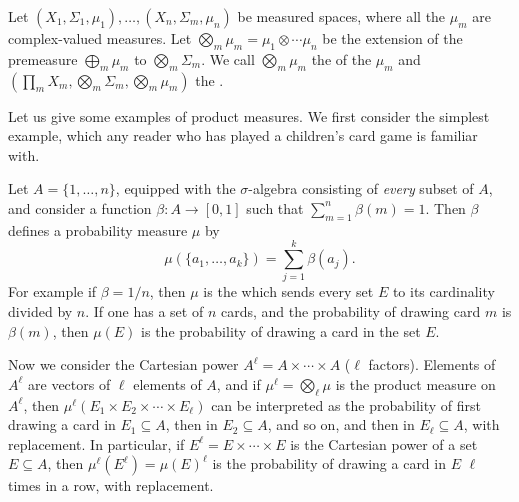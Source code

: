 \begin{definition}
Let $(X_{1}, \Sigma_{1}, \mu_{1}), \dots, (X_{n}, \Sigma_{m}, \mu_{n})$ be measured spaces, where all the $\mu_{m}$ are complex-valued measures.
Let $\bigotimes_{m} \mu_{m} = \mu_{1} \otimes \cdots \mu_{n}$ be the extension of the premeasure $\bigoplus_{m} \mu_{m}$ to $\bigotimes_{m} \Sigma_{m}$.
We call $\bigotimes_{m} \mu_{m}$ the  of the $\mu_{m}$ and $(\prod_{m} X_{m}, \bigotimes_{m} \Sigma_{m}, \bigotimes_{m} \mu_{m})$ the .
\end{definition}

Let us give some examples of product measures.
We first consider the simplest example, which any reader who has played a children's card game is familiar with.

\begin{example}\label{card games}
Let $A = \{1, \dots, n\}$, equipped with the $\sigma$-algebra consisting of \emph{every} subset of $A$, and consider a function $\beta: A \to [0, 1]$ such that $\sum_{m=1}^{n} \beta(m) = 1$.
Then $\beta$ defines a probability measure $\mu$ by
\[\mu(\{a_{1}, \dots, a_{k}\}) = \sum_{j=1}^{k} \beta(a_{j}).\]
For example if $\beta = 1/n$, then $\mu$ is the  which sends every set $E$ to its cardinality divided by $n$.
If one has a set of $n$ cards, and the probability of drawing card $m$ is $\beta(m)$, then $\mu(E)$ is the probability of drawing a card in the set $E$.

Now we consider the Cartesian power $A^{\ell} = A \times \cdots \times A$ ($\ell$ factors).
Elements of $A^{\ell}$ are vectors of $\ell$ elements of $A$, and if $\mu^{\ell} = \bigotimes_{\ell} \mu$ is the product measure on $A^{\ell}$, then $\mu^{\ell}(E_{1} \times E_{2} \times \cdots \times E_{\ell})$ can be interpreted as the probability of first drawing a card in $E_{1} \subseteq A$, then in $E_{2} \subseteq A$, and so on, and then in $E_{\ell} \subseteq A$, with replacement.
In particular, if $E^{\ell} = E \times \cdots \times E$ is the Cartesian power of a set $E \subseteq A$, then $\mu^{\ell}(E^{\ell}) = \mu{(E)}^{\ell}$ is the probability of drawing a card in $E$ $\ell$ times in a row, with replacement.
\end{example}

